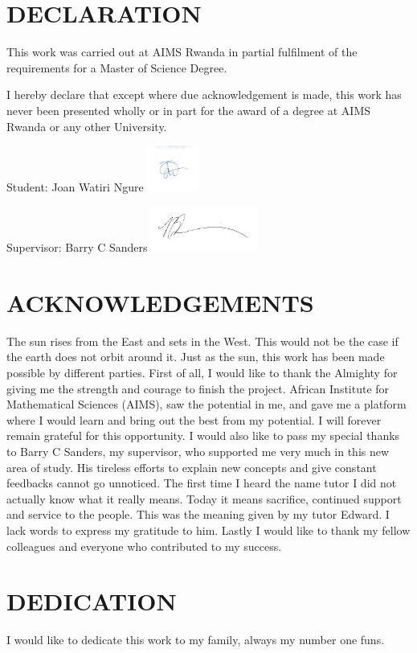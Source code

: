 \chapter*{DECLARATION}
This work was carried out at AIMS Rwanda in partial fulfilment of the requirements for a Master of Science Degree.

I hereby declare that except where due acknowledgement is made, this work has never been presented wholly or in part for the award of a degree at AIMS Rwanda or any other University.

\vspace{1.5cm}
Student: Joan  Watiri Ngure \includegraphics[height=1.5cm]{images/Joan.png}

\vspace{1.5cm}

Supervisor: Barry C Sanders \includegraphics[height=1.5cm]{images/Barry.jpg}


\newpage

\chapter*{ACKNOWLEDGEMENTS}

The sun rises from the East and sets in the West. This would not be the case if the earth does not orbit around it. Just as the sun, this work has been made possible by different parties. First of all, I would like to thank the Almighty for giving me the strength and courage to finish the project. African Institute for Mathematical Sciences (AIMS), saw the potential in me, and gave me a platform where I would learn and bring out the best from my potential. I will forever remain grateful for this opportunity. I would also like to pass my special thanks to Barry C Sanders, my supervisor, who  supported me very much in this new area of study. His tireless efforts to explain new concepts and give constant feedbacks cannot go unnoticed. The first time I heard the name tutor I did not actually know what it really means. Today it means sacrifice, continued support and service to the people. This was the meaning given by my tutor Edward. I lack words to express my gratitude to him. Lastly I would like to thank my fellow colleagues and everyone who contributed to my success.
\newpage
\chapter*{DEDICATION} 

I would like to dedicate this work to my family, always my number one funs.